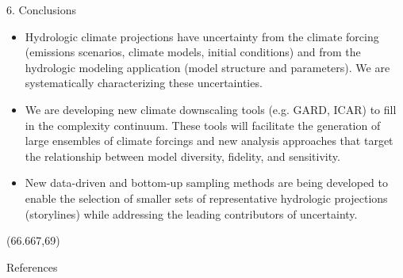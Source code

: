 \documentclass{beamer}
\begin{document}
\begin{frame}{}
\begin{columns}
\begin{column}{.3333\paperwidth}
\begin{textblock}{\textwidth \TPHorizModule}
\begin{block}{6. Conclusions}
     \vspace{-1cm}
     \begin{shaded}
      \begin{itemize}         \vspace{1cm}
       \justifying
       \item Hydrologic climate projections have uncertainty from the climate forcing (emissions scenarios, climate models, initial conditions) and from the hydrologic modeling application (model structure and parameters). We are systematically characterizing these uncertainties. \vspace{1cm}
       \item We are developing new climate downscaling tools (e.g. GARD, ICAR) to fill in the complexity continuum. These tools will facilitate the generation of large ensembles of climate forcings and new analysis approaches that target the relationship between model diversity, fidelity, and sensitivity. \vspace{1cm}
       \item New data-driven and bottom-up sampling methods are being developed to enable the selection of smaller sets of representative hydrologic projections (storylines) while addressing the leading contributors of uncertainty. \vspace{1cm}

      \end{itemize}

     \end{shaded}
     \vspace{-1cm}

    \end{block}
   \end{textblock}

   \begin{textblock}{\textwidth \TPHorizModule}(66.667,69)
   \vspace{-2cm}
    \begin{block}{References}


     \justifying
     

     \scriptsize %

    \end{block}
   \end{textblock}


  \end{column}
 \end{columns}
\end{frame}
\end{document}
